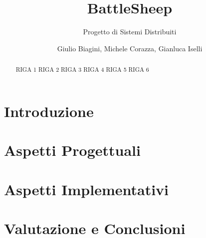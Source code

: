 \documentclass[a4paper,10pt]{scrartcl}
\begin{document}
\title{BattleSheep}
\subtitle{Progetto di Sistemi Distribuiti}
\author{Giulio Biagini, Michele Corazza, Gianluca Iselli}
\maketitle

\begin{abstract}
RIGA 1\newline
RIGA 2\newline
RIGA 3\newline
RIGA 4\newline
RIGA 5\newline
RIGA 6
\end{abstract}

\section{Introduzione}


\section{Aspetti Progettuali}




\section{Aspetti Implementativi}
%
%



\section{Valutazione e Conclusioni}

\end{document}
